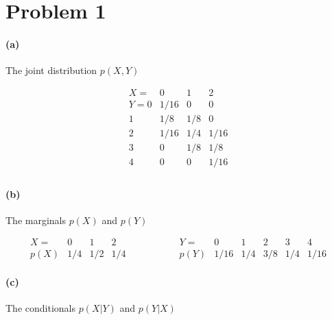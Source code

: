 \documentclass[11pt]{article}
\newcommand{\pr}[1]{\ensuremath{p(#1)}}
\begin{document}

\section{Problem 1}

\paragraph{(a)} The joint distribution \pr{X,Y}

\begin{equation}
    \begin{array}{r|ccc}
        X=  & 0 & 1 & 2 \\\hline
        Y=0 & 1/16 & 0 & 0 \\
        1 & 1/8 & 1/8 & 0 \\
        2 & 1/16 & 1/4 & 1/16 \\
        3 & 0 & 1/8 & 1/8 \\
        4 & 0 & 0 & 1/16 \\
    \end{array}
\end{equation}

\paragraph{(b)} The marginals \pr{X} and \pr{Y}

\begin{equation}
    \begin{array}{r|ccc}
        X=  & 0 & 1 & 2 \\\hline
        \pr{X} & 1/4 & 1/2 & 1/4
    \end{array} \hspace{2cm}
    \begin{array}{r|ccccc}
        Y=  & 0 & 1 & 2 & 3 & 4 \\\hline
        \pr{Y} & 1/16 & 1/4 & 3/8 & 1/4 & 1/16
    \end{array}
\end{equation}

\paragraph{(c)} The conditionals \pr{X|Y} and \pr{Y|X}
\end{document}
